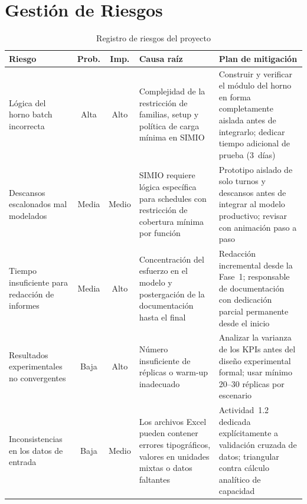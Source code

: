 \documentclass[12pt]{article}
\begin{document}
\newpage
\section{Gestión de Riesgos}

\begin{table}[h!]
\centering
\caption{Registro de riesgos del proyecto}
\label{tab:riesgos}
\renewcommand{\arraystretch}{1.4}
\begin{tabularx}{\textwidth}{p{3.2cm}ccXX}
\toprule
\rowcolor{tabhead}
\color{white}\textbf{Riesgo} &
\color{white}\textbf{Prob.} &
\color{white}\textbf{Imp.} &
\color{white}\textbf{Causa raíz} &
\color{white}\textbf{Plan de mitigación} \\
\midrule

\rowcolor{tabrow}
Lógica del horno batch incorrecta &
Alta & Alto &
Complejidad de la restricción de familias, setup y política de carga mínima en SIMIO &
Construir y verificar el módulo del horno en forma completamente aislada antes de integrarlo; dedicar tiempo adicional de prueba (3~días) \\

Descansos escalonados mal modelados &
Media & Medio &
SIMIO requiere lógica específica para schedules con restricción de cobertura mínima por función &
Prototipo aislado de solo turnos y descansos antes de integrar al modelo productivo; revisar con animación paso a paso \\

\rowcolor{tabrow}
Tiempo insuficiente para redacción de informes &
Media & Alto &
Concentración del esfuerzo en el modelo y postergación de la documentación hasta el final &
Redacción incremental desde la Fase~1; responsable de documentación con dedicación parcial permanente desde el inicio \\

Resultados experimentales no convergentes &
Baja & Alto &
Número insuficiente de réplicas o warm-up inadecuado &
Analizar la varianza de los KPIs antes del diseño experimental formal; usar mínimo 20--30 réplicas por escenario \\

\rowcolor{tabrow}
Inconsistencias en los datos de entrada &
Baja & Medio &
Los archivos Excel pueden contener errores tipográficos, valores en unidades mixtas o datos faltantes &
Actividad~1.2 dedicada explícitamente a validación cruzada de datos; triangular contra cálculo analítico de capacidad \\

\bottomrule
\end{tabularx}
\end{table}
\end{document}
